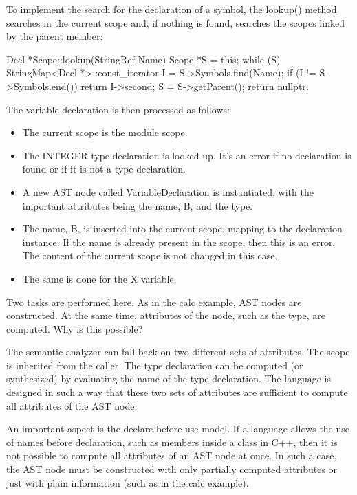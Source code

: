 To implement the search for the declaration of a symbol, the lookup() method searches in the current scope and, if nothing is found, searches the scopes linked by the parent member:

\begin{cpp}
Decl *Scope::lookup(StringRef Name) {
    Scope *S = this;
    while (S) {
        StringMap<Decl *>::const_iterator I =
        S->Symbols.find(Name);
        if (I != S->Symbols.end())
        return I->second;
        S = S->getParent();
    }
    return nullptr;
}
\end{cpp}

The variable declaration is then processed as follows:

\begin{itemize}
\item
The current scope is the module scope.

\item
The INTEGER type declaration is looked up. It’s an error if no declaration is found or if it is not a type declaration.

\item
A new AST node called VariableDeclaration is instantiated, with the important attributes being the name, B, and the type.

\item
The name, B, is inserted into the current scope, mapping to the declaration instance. If the name is already present in the scope, then this is an error. The content of the current scope is not changed in this case.

\item
The same is done for the X variable.
\end{itemize}

Two tasks are performed here. As in the calc example, AST nodes are constructed. At the same time, attributes of the node, such as the type, are computed. Why is this possible?

The semantic analyzer can fall back on two different sets of attributes. The scope is inherited from the caller. The type declaration can be computed (or synthesized) by evaluating the name of the type declaration. The language is designed in such a way that these two sets of attributes are sufficient to compute all attributes of the AST node.

An important aspect is the declare-before-use model. If a language allows the use of names before declaration, such as members inside a class in C++, then it is not possible to compute all attributes of an AST node at once. In such a case, the AST node must be constructed with only partially computed attributes or just with plain information (such as in the calc example).


